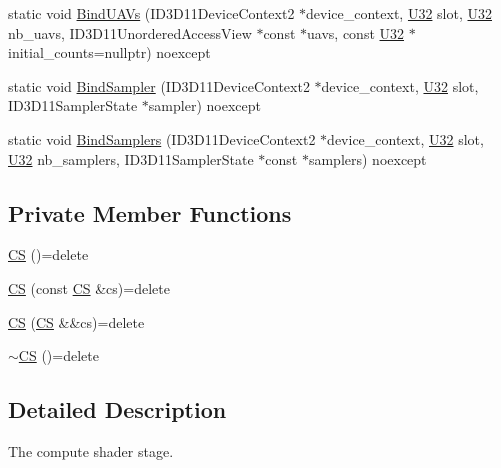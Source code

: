 \begin{DoxyCompactItemize}
\item 
static void \hyperlink{structmage_1_1_pipeline_1_1_c_s_ac0c8992da9bc2a39789c6bcd03808d83}{Bind\+U\+A\+Vs} (I\+D3\+D11\+Device\+Context2 $\ast$device\+\_\+context, \hyperlink{namespacemage_a41c104c036fba3756a74e19f793eeaa1}{U32} slot, \hyperlink{namespacemage_a41c104c036fba3756a74e19f793eeaa1}{U32} nb\+\_\+uavs, I\+D3\+D11\+Unordered\+Access\+View $\ast$const $\ast$uavs, const \hyperlink{namespacemage_a41c104c036fba3756a74e19f793eeaa1}{U32} $\ast$initial\+\_\+counts=nullptr) noexcept
\item 
static void \hyperlink{structmage_1_1_pipeline_1_1_c_s_ab796807118ca67a781cfe240b7e4c356}{Bind\+Sampler} (I\+D3\+D11\+Device\+Context2 $\ast$device\+\_\+context, \hyperlink{namespacemage_a41c104c036fba3756a74e19f793eeaa1}{U32} slot, I\+D3\+D11\+Sampler\+State $\ast$sampler) noexcept
\item 
static void \hyperlink{structmage_1_1_pipeline_1_1_c_s_a31e208601ec968ba631ac8a76486a4aa}{Bind\+Samplers} (I\+D3\+D11\+Device\+Context2 $\ast$device\+\_\+context, \hyperlink{namespacemage_a41c104c036fba3756a74e19f793eeaa1}{U32} slot, \hyperlink{namespacemage_a41c104c036fba3756a74e19f793eeaa1}{U32} nb\+\_\+samplers, I\+D3\+D11\+Sampler\+State $\ast$const $\ast$samplers) noexcept
\end{DoxyCompactItemize}
\subsection*{Private Member Functions}
\begin{DoxyCompactItemize}
\item 
\hyperlink{structmage_1_1_pipeline_1_1_c_s_a83cfca7bdab3af17ffbcf42efe76aab0}{CS} ()=delete
\item 
\hyperlink{structmage_1_1_pipeline_1_1_c_s_ab982a32a1a70e7fb85c94ab521b1c24e}{CS} (const \hyperlink{structmage_1_1_pipeline_1_1_c_s}{CS} \&cs)=delete
\item 
\hyperlink{structmage_1_1_pipeline_1_1_c_s_a82979b128dde2f2750813986cbf69903}{CS} (\hyperlink{structmage_1_1_pipeline_1_1_c_s}{CS} \&\&cs)=delete
\item 
\hyperlink{structmage_1_1_pipeline_1_1_c_s_a8061d73f9cc268ce883dd0fd3c9f094c}{$\sim$\+CS} ()=delete
\end{DoxyCompactItemize}


\subsection{Detailed Description}
The compute shader stage. 

